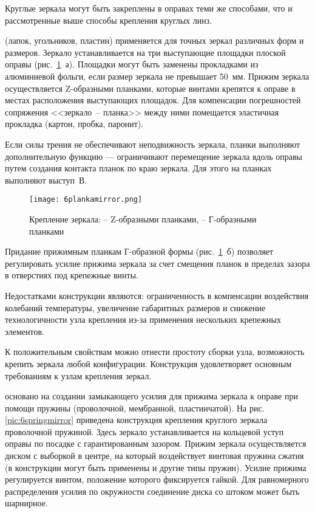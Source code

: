 Круглые зеркала могут быть закреплены в оправах теми же способами, что и рассмотренные выше способы крепления круглых линз. 

  (лапок, угольников, пластин) применяется для точных зеркал различных форм и размеров. 
Зеркало устанавливается на три выступающие площадки плоской оправы (рис.~\ref{pic:6plankamirror}~а). 
Площадки могут быть заменены прокладками из алюминиевой фольги, если размер зеркала не превышает 50~мм. 
Прижим зеркала осуществляется Z-образными планками, которые винтами крепятся к оправе в местах расположения выступающих площадок. 
Для компенсации погрешностей сопряжения <<зеркало~-- планка>> между ними помещается эластичная прокладка (картон, пробка, паронит).

Если силы трения не обеспечивают неподвижность зеркала, планки выполняют дополнительную функцию --- ограничивают перемещение зеркала вдоль оправы путем создания контакта планок по краю зеркала. 
Для этого на планках выполняют выступ~В.

\begin{figure}[h!]
	\texttt{[image: 6plankamirror.png]}
	\caption[Крепление зеркала Z-образными и Г-образными планками]{ Крепление зеркала:  -- Z-образными планками,  -- Г-образными планками }
	\label{pic:6plankamirror}
\end{figure}

Придание прижимным планкам Г-образной формы (рис.~\ref{pic:6plankamirror}~б) позволяет регулировать усилие прижима зеркала за счет смещения планок в пределах зазора в отверстиях под крепежные винты.

Недостатками конструкции являются: ограниченность в компенсации воздействия колебаний температуры, увеличение габаритных размеров и снижение технологичности узла крепления из-за применения нескольких крепежных элементов.

К положительным свойствам можно отнести простоту сборки узла, возможность крепить зеркала любой конфигурации. Конструкция удовлетворяет основным требованиям к узлам крепления зеркал.

  основано на создании замыкающего усилия для прижима зеркала к оправе при помощи пружины (проволочной, мембранной, пластинчатой). 
На рис.\ref{pic:6springmirror} приведена конструкция крепления круглого зеркала проволочной пружиной. 
Здесь зеркало устанавливается на кольцевой уступ оправы по посадке с гарантированным зазором. 
Прижим зеркала осуществляется диском с выборкой в центре, на который воздействует винтовая пружина сжатия (в конструкции могут быть применены и другие типы пружин). 
Усилие прижима регулируется винтом, положение которого фиксируется гайкой. 
Для равномерного распределения усилия по окружности соединение диска со штоком может быть шарнирное.

